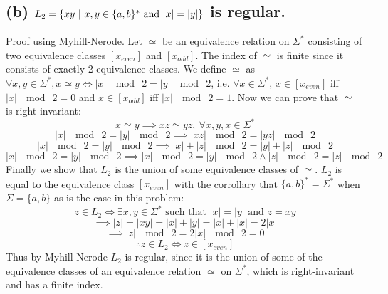 \documentclass[12pt]{article}
\begin{document}
\subsection*{(b) $L_2 = \{xy\ |\ x,y \in \{a,b\}^*
\textnormal{ and } |x| = |y|\}$ is \textnormal{regular.}}
Proof using Myhill-Nerode. Let $\simeq$ be an equivalence relation on
$\Sigma^*$ consisting of two equivalence classes $[x_{even}]$ and $[x_{odd}]$.
The index of $\simeq$ is finite since it consists of exactly 2
equivalence classes. We define $\simeq$ as $\forall x,y \in \Sigma^*,
x \simeq y \iff |x|\ \mod\ 2 = |y|\ \mod\ 2$, i.e. $\forall x \in \Sigma^*$,
$x \in [x_{even}]$ iff $|x|\ \mod\ 2 = 0$ and $x \in [x_{odd}]$ iff
$|x|\ \mod\ 2 = 1$. Now we can prove that $\simeq$ is right-invariant:
$$ x \simeq y \implies xz \simeq yz,\ \forall x,y,x \in \Sigma^*$$
$$ |x|\ \mod\ 2 = |y|\ \mod\ 2 \implies |xz|\ \mod\ 2 = |yz|\ \mod\ 2$$
$$ |x|\ \mod\ 2 = |y|\ \mod\ 2 \implies |x|+|z|\ \mod\ 2 = |y|+|z|\ \mod\ 2$$
$$ |x|\ \mod\ 2 = |y|\ \mod\ 2 \implies |x|\ \mod\ 2 = |y|\ \mod\ 2 \wedge
|z|\ \mod\ 2 = |z|\ \mod\ 2$$
Finally we show that $L_2$ is the union of some equivalence classes of $\simeq$.
$L_2$ is equal to the equivalence class $[x_{even}]$ with the corrollary that
$\{a,b\}^* = \Sigma^*$ when $\Sigma = \{a,b\}$ as is the case in this problem:
$$ z \in L_2 \iff \exists x,y \in \Sigma^* \text{ such that } |x| = |y|
\text{ and } z = xy$$
$$\implies |z| = |xy| = |x| + |y| = |x| + |x| = 2|x|$$
$$\implies |z|\ \mod\ 2 = 2|x|\ \mod\ 2 = 0$$
$$\therefore z \in L_2 \iff z \in [x_{even}]$$
Thus by Myhill-Nerode $L_2$ is regular, since it is the union of some of the
equivalence classes of an equivalence relation $\simeq$ on $\Sigma^*$, which
is right-invariant and has a finite index.
\end{document}
